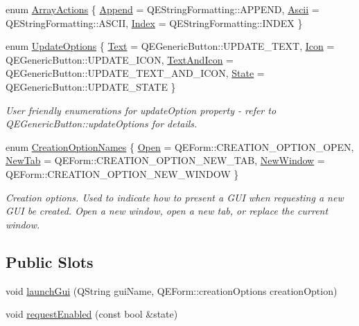 \begin{DoxyCompactItemize}
enum \hyperlink{classQEPushButton_abdadbc10b7de6910230af3e102f6296c}{ArrayActions} \{ \hyperlink{classQEPushButton_abdadbc10b7de6910230af3e102f6296caea2b0ce777f5e74b75ea2889863789ca}{Append} =  QEStringFormatting::APPEND, 
\hyperlink{classQEPushButton_abdadbc10b7de6910230af3e102f6296ca384df42b52c3fd5f3a64bcb3a6e84a80}{Ascii} =  QEStringFormatting::ASCII, 
\hyperlink{classQEPushButton_abdadbc10b7de6910230af3e102f6296ca350ea32a573ad73d94c25e37145d3422}{Index} =  QEStringFormatting::INDEX
 \}
\item 
enum \hyperlink{classQEPushButton_a8e2016e5cdcbe54a5fe6d22a32410834}{UpdateOptions} \{ \hyperlink{classQEPushButton_a8e2016e5cdcbe54a5fe6d22a32410834adcc345160d5f4d7cc0ab90c29cba792e}{Text} =  QEGenericButton::UPDATE\_\-TEXT, 
\hyperlink{classQEPushButton_a8e2016e5cdcbe54a5fe6d22a32410834a83d371cab542a4005d21f8369ce8d214}{Icon} =  QEGenericButton::UPDATE\_\-ICON, 
\hyperlink{classQEPushButton_a8e2016e5cdcbe54a5fe6d22a32410834adb10c2ae6d04214cb6e3a24aec27f099}{TextAndIcon} =  QEGenericButton::UPDATE\_\-TEXT\_\-AND\_\-ICON, 
\hyperlink{classQEPushButton_a8e2016e5cdcbe54a5fe6d22a32410834a910927f933dd0dd4b6880c92cea853f0}{State} =  QEGenericButton::UPDATE\_\-STATE
 \}
\begin{DoxyCompactList}\small\item\em User friendly enumerations for updateOption property -\/ refer to QEGenericButton::updateOptions for details. \end{DoxyCompactList}\item 
enum \hyperlink{classQEPushButton_a739432b8d095d67512aae5d81fcea094}{CreationOptionNames} \{ \hyperlink{classQEPushButton_a739432b8d095d67512aae5d81fcea094a095891158cfa4ba63246074dc5604756}{Open} =  QEForm::CREATION\_\-OPTION\_\-OPEN, 
\hyperlink{classQEPushButton_a739432b8d095d67512aae5d81fcea094a3ac54242401c23c28769906fb0425cfa}{NewTab} =  QEForm::CREATION\_\-OPTION\_\-NEW\_\-TAB, 
\hyperlink{classQEPushButton_a739432b8d095d67512aae5d81fcea094abc24475fd9e104561f55af238ba71431}{NewWindow} =  QEForm::CREATION\_\-OPTION\_\-NEW\_\-WINDOW
 \}
\begin{DoxyCompactList}\small\item\em Creation options. Used to indicate how to present a GUI when requesting a new GUI be created. Open a new window, open a new tab, or replace the current window. \end{DoxyCompactList}\end{DoxyCompactItemize}
\subsection*{Public Slots}
\begin{DoxyCompactItemize}
\item 
void \hyperlink{classQEPushButton_a5c0a901fa1a4dd54f4cb5eb344305822}{launchGui} (QString guiName, QEForm::creationOptions creationOption)
\item 
void \hyperlink{classQEPushButton_a7c45ea3a5303929fa4985a8f874ecac6}{requestEnabled} (const bool \&state)
\end{DoxyCompactItemize}
